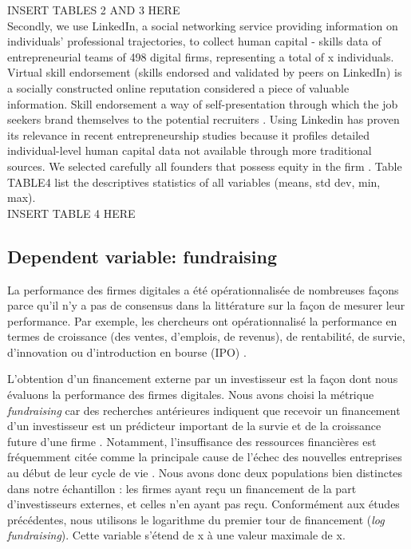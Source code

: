 \documentclass[12pt]{article}
\begin{document}
INSERT TABLES 2 AND 3 HERE \\

Secondly, we use LinkedIn, a social networking service providing information on individuals' professional trajectories, to collect human capital - skills data of entrepreneurial teams of 498 digital firms, representing a total of x individuals. Virtual skill endorsement (skills endorsed and validated by peers on LinkedIn) is a socially constructed online reputation considered a piece of valuable information. Skill endorsement a way of self-presentation through which the job seekers brand themselves to the potential recruiters \citep{rapanta2017linkedin}. Using Linkedin has proven its relevance in recent entrepreneurship studies because it profiles detailed individual-level human capital data not available through more traditional sources. We selected carefully all founders that possess equity in the firm \citep{knight2020start, xie2020does}. Table TABLE4 list the descriptives statistics of all variables (means, std dev, min, max). \\

INSERT TABLE 4 HERE

\subsection{Dependent variable: fundraising}

La performance des firmes digitales a été opérationnalisée de nombreuses façons parce qu'il n'y a pas de consensus dans la littérature sur la façon de mesurer leur performance. Par exemple, les chercheurs ont opérationnalisé la performance en termes de croissance (des ventes, d'emplois, de revenus), de rentabilité, de survie, d'innovation ou d'introduction en bourse (IPO) \citep{delmar2003arriving}.

L'obtention d'un financement externe par un investisseur est la façon dont nous évaluons la performance des firmes digitales. Nous avons choisi la métrique \textit{fundraising} car des recherches antérieures indiquent que recevoir un financement d'un investisseur est un prédicteur important de la survie et de la croissance future d'une firme \citep{beckman2007early}. Notamment, l'insuffisance des ressources financières est fréquemment citée comme la principale cause de l'échec des nouvelles entreprises au début de leur cycle de vie \citep{franke2008venture, eddleston2016you}. Nous avons donc deux populations bien distinctes dans notre échantillon : les firmes ayant reçu un financement de la part d'investisseurs externes, et celles n'en ayant pas reçu. Conformément aux études précédentes, nous utilisons le logarithme du premier tour de financement (\textit{log fundraising}). Cette variable s'étend de x à une valeur maximale de x.
\end{document}
